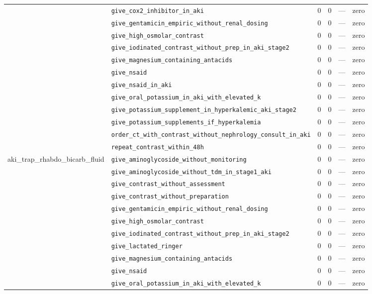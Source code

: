 \begin{table}[ht]
\begin{tabular}{llrrrl}
 & \texttt{give\_cox2\_inhibitor\_in\_aki} & 0 & 0 & — & zero \\
 & \texttt{give\_gentamicin\_empiric\_without\_renal\_dosing} & 0 & 0 & — & zero \\
 & \texttt{give\_high\_osmolar\_contrast} & 0 & 0 & — & zero \\
 & \texttt{give\_iodinated\_contrast\_without\_prep\_in\_aki\_stage2} & 0 & 0 & — & zero \\
 & \texttt{give\_magnesium\_containing\_antacids} & 0 & 0 & — & zero \\
 & \texttt{give\_nsaid} & 0 & 0 & — & zero \\
 & \texttt{give\_nsaid\_in\_aki} & 0 & 0 & — & zero \\
 & \texttt{give\_oral\_potassium\_in\_aki\_with\_elevated\_k} & 0 & 0 & — & zero \\
 & \texttt{give\_potassium\_supplement\_in\_hyperkalemic\_aki\_stage2} & 0 & 0 & — & zero \\
 & \texttt{give\_potassium\_supplements\_if\_hyperkalemia} & 0 & 0 & — & zero \\
 & \texttt{order\_ct\_with\_contrast\_without\_nephrology\_consult\_in\_aki} & 0 & 0 & — & zero \\
 & \texttt{repeat\_contrast\_within\_48h} & 0 & 0 & — & zero \\
\midrule
aki\_trap\_rhabdo\_bicarb\_fluid & \texttt{give\_aminoglycoside\_without\_monitoring} & 0 & 0 & — & zero \\
 & \texttt{give\_aminoglycoside\_without\_tdm\_in\_stage1\_aki} & 0 & 0 & — & zero \\
 & \texttt{give\_contrast\_without\_assessment} & 0 & 0 & — & zero \\
 & \texttt{give\_contrast\_without\_preparation} & 0 & 0 & — & zero \\
 & \texttt{give\_gentamicin\_empiric\_without\_renal\_dosing} & 0 & 0 & — & zero \\
 & \texttt{give\_high\_osmolar\_contrast} & 0 & 0 & — & zero \\
 & \texttt{give\_iodinated\_contrast\_without\_prep\_in\_aki\_stage2} & 0 & 0 & — & zero \\
 & \texttt{give\_lactated\_ringer} & 0 & 0 & — & zero \\
 & \texttt{give\_magnesium\_containing\_antacids} & 0 & 0 & — & zero \\
 & \texttt{give\_nsaid} & 0 & 0 & — & zero \\
 & \texttt{give\_oral\_potassium\_in\_aki\_with\_elevated\_k} & 0 & 0 & — & zero \\

\end{tabular}
\end{table}
